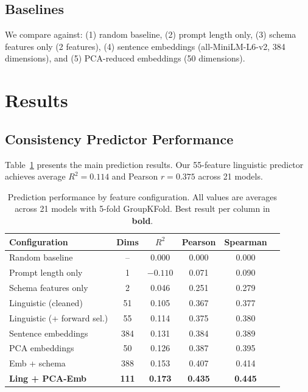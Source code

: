 \documentclass{article}
\begin{document}
\subsection{Baselines}

We compare against: (1) random baseline, (2) prompt length only, (3) schema features only (2 features), (4) sentence embeddings (all-MiniLM-L6-v2, 384 dimensions), and (5) PCA-reduced embeddings (50 dimensions).


\section{Results}
\label{sec:results}

\subsection{Consistency Predictor Performance}
\label{sec:predictor}

Table~\ref{tab:main_results} presents the main prediction results. Our 55-feature linguistic predictor achieves average $R^2 = 0.114$ and Pearson $r = 0.375$ across 21 models.

\begin{table}[t]
\centering
\caption{Prediction performance by feature configuration. All values are averages across 21 models with 5-fold GroupKFold. Best result per column in \textbf{bold}.}
\label{tab:main_results}
\small
\begin{tabular}{@{}lccccc@{}}
\toprule
Configuration & Dims & $R^2$ & Pearson & Spearman \\
\midrule
Random baseline & -- & 0.000 & 0.000 & 0.000 \\
Prompt length only & 1 & $-0.110$ & 0.071 & 0.090 \\
Schema features only & 2 & 0.046 & 0.251 & 0.279 \\
\midrule
Linguistic (cleaned) & 51 & 0.105 & 0.367 & 0.377 \\
Linguistic (+ forward sel.) & 55 & 0.114 & 0.375 & 0.380 \\
\midrule
Sentence embeddings & 384 & 0.131 & 0.384 & 0.389 \\
PCA embeddings & 50 & 0.126 & 0.387 & 0.395 \\
Emb + schema & 388 & 0.153 & 0.407 & 0.414 \\
\midrule
\textbf{Ling + PCA-Emb} & \textbf{111} & \textbf{0.173} & \textbf{0.435} & \textbf{0.445} \\
\bottomrule
\end{tabular}
\end{table}
\end{document}
